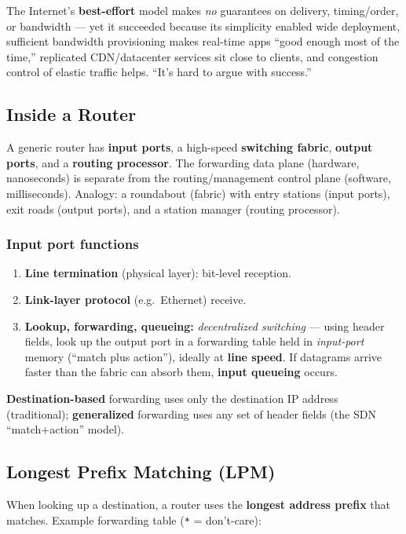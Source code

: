 \documentclass[hidelinks]{article}
\begin{document}
\medskip
\noindent The Internet's \textbf{best-effort} model makes \emph{no}
guarantees on delivery, timing/order, or bandwidth --- yet it succeeded
because its simplicity enabled wide deployment, sufficient bandwidth
provisioning makes real-time apps ``good enough most of the time,''
replicated CDN/datacenter services sit close to clients, and congestion
control of elastic traffic helps. ``It's hard to argue with success.''

\subsection{Inside a Router}

A generic router has \textbf{input ports}, a high-speed \textbf{switching
fabric}, \textbf{output ports}, and a \textbf{routing processor}. The
forwarding data plane (hardware, nanoseconds) is separate from the
routing/management control plane (software, milliseconds). Analogy: a
roundabout (fabric) with entry stations (input ports), exit roads (output
ports), and a station manager (routing processor).

\subsubsection{Input port functions}
\begin{enumerate}
    \item \textbf{Line termination} (physical layer): bit-level reception.
    \item \textbf{Link-layer protocol} (e.g.\ Ethernet) receive.
    \item \textbf{Lookup, forwarding, queueing:} \emph{decentralized
    switching} --- using header fields, look up the output port in a
    forwarding table held in \emph{input-port} memory (``match plus
    action''), ideally at \textbf{line speed}. If datagrams arrive faster
    than the fabric can absorb them, \textbf{input queueing} occurs.
\end{enumerate}
\textbf{Destination-based} forwarding uses only the destination IP address
(traditional); \textbf{generalized} forwarding uses any set of header fields
(the SDN ``match+action'' model).

\subsection{Longest Prefix Matching (LPM)}

When looking up a destination, a router uses the \textbf{longest address
prefix} that matches. Example forwarding table (\texttt{*} = don't-care):
\end{document}
